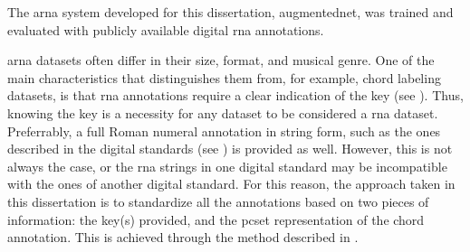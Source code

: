 
The \gls{arna} system developed for this dissertation,
\gls{augmentednet}, was trained and evaluated with publicly
available digital \gls{rna} annotations. 

\gls{arna} datasets often  differ in their size, format, and
musical genre. One of the main characteristics that
distinguishes them from, for example, chord labeling
datasets, is that \gls{rna} annotations require a clear
indication of the key (see ). Thus,
knowing the key is a necessity for any dataset to be
considered a \gls{rna} dataset. Preferrably, a full Roman
numeral annotation in string form, such as the ones
described in the digital standards (see
) is provided as well.
However, this is not always the case, or the \gls{rna}
strings in one digital standard may be incompatible with the
ones of another digital standard. For this reason, the
approach taken in this dissertation is to standardize all
the annotations based on two pieces of information: the
key(s) provided, and the \gls{pcset} representation of the
chord annotation. This is achieved through the method
described in
.


